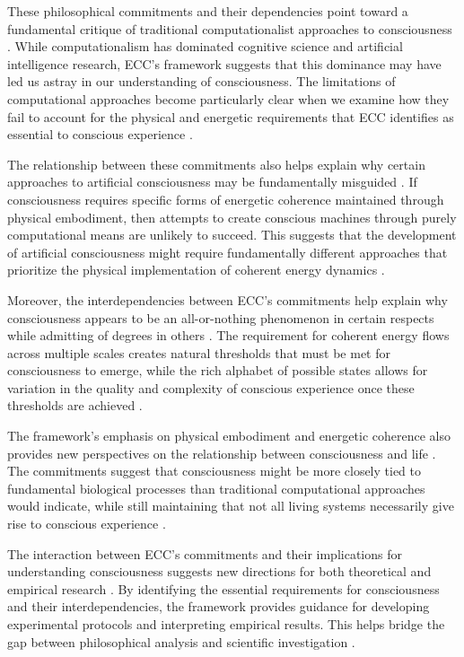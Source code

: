 \begin{refsection}
These philosophical commitments and their dependencies point toward a fundamental critique of traditional computationalist approaches to consciousness \cite{dennett2017from}. While computationalism has dominated cognitive science and artificial intelligence research, ECC's framework suggests that this dominance may have led us astray in our understanding of consciousness. The limitations of computational approaches become particularly clear when we examine how they fail to account for the physical and energetic requirements that ECC identifies as essential to conscious experience \cite{wilson2004boundaries}.

The relationship between these commitments also helps explain why certain approaches to artificial consciousness may be fundamentally misguided \cite{noe2004action}. If consciousness requires specific forms of energetic coherence maintained through physical embodiment, then attempts to create conscious machines through purely computational means are unlikely to succeed. This suggests that the development of artificial consciousness might require fundamentally different approaches that prioritize the physical implementation of coherent energy dynamics \cite{oregan2001sensorimotor}.

Moreover, the interdependencies between ECC's commitments help explain why consciousness appears to be an all-or-nothing phenomenon in certain respects while admitting of degrees in others \cite{hurley1998consciousness}. The requirement for coherent energy flows across multiple scales creates natural thresholds that must be met for consciousness to emerge, while the rich alphabet of possible states allows for variation in the quality and complexity of conscious experience once these thresholds are achieved \cite{gallagher2005how}.

The framework's emphasis on physical embodiment and energetic coherence also provides new perspectives on the relationship between consciousness and life \cite{kirchhoff2019extended}. The commitments suggest that consciousness might be more closely tied to fundamental biological processes than traditional computational approaches would indicate, while still maintaining that not all living systems necessarily give rise to conscious experience \cite{haugeland1993mind}.

The interaction between ECC's commitments and their implications for understanding consciousness suggests new directions for both theoretical and empirical research \cite{wilson2004boundaries}. By identifying the essential requirements for consciousness and their interdependencies, the framework provides guidance for developing experimental protocols and interpreting empirical results. This helps bridge the gap between philosophical analysis and scientific investigation \cite{clark2013whatever}.


\end{refsection}
